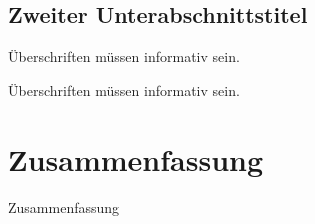 \documentclass{beamer}
\begin{document}
\subsection{Zweiter Unterabschnittstitel}

\begin{frame}{Überschriften müssen informativ sein.}
\end{frame}

\begin{frame}{Überschriften müssen informativ sein.}
\end{frame}

\section*{Zusammenfassung}

\begin{frame}{Zusammenfassung}

\end{frame}
\end{document}
